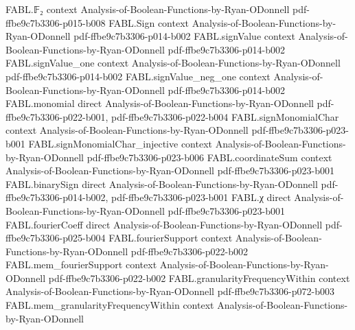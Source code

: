 \begin{theorem}
\label{FABL.expect_selectedWidth_le_clog_add_one}
\leanok
{}
\proofstep
  {FABL.𝔽₂}
  {context}
  {Analysis-of-Boolean-Functions-by-Ryan-ODonnell}
  {pdf-ffbe9c7b3306-p015-b008}
\proofstep
  {FABL.Sign}
  {context}
  {Analysis-of-Boolean-Functions-by-Ryan-ODonnell}
  {pdf-ffbe9c7b3306-p014-b002}
\proofstep
  {FABL.signValue}
  {context}
  {Analysis-of-Boolean-Functions-by-Ryan-ODonnell}
  {pdf-ffbe9c7b3306-p014-b002}
\proofstep
  {FABL.signValue_one}
  {context}
  {Analysis-of-Boolean-Functions-by-Ryan-ODonnell}
  {pdf-ffbe9c7b3306-p014-b002}
\proofstep
  {FABL.signValue_neg_one}
  {context}
  {Analysis-of-Boolean-Functions-by-Ryan-ODonnell}
  {pdf-ffbe9c7b3306-p014-b002}
\proofstep
  {FABL.monomial}
  {direct}
  {Analysis-of-Boolean-Functions-by-Ryan-ODonnell}
  {pdf-ffbe9c7b3306-p022-b001,
    pdf-ffbe9c7b3306-p022-b004}
\proofstep
  {FABL.signMonomialChar}
  {context}
  {Analysis-of-Boolean-Functions-by-Ryan-ODonnell}
  {pdf-ffbe9c7b3306-p023-b001}
\proofstep
  {FABL.signMonomialChar_injective}
  {context}
  {Analysis-of-Boolean-Functions-by-Ryan-ODonnell}
  {pdf-ffbe9c7b3306-p023-b006}
\proofstep
  {FABL.coordinateSum}
  {context}
  {Analysis-of-Boolean-Functions-by-Ryan-ODonnell}
  {pdf-ffbe9c7b3306-p023-b001}
\proofstep
  {FABL.binarySign}
  {direct}
  {Analysis-of-Boolean-Functions-by-Ryan-ODonnell}
  {pdf-ffbe9c7b3306-p014-b002,
    pdf-ffbe9c7b3306-p023-b001}
\proofstep
  {FABL.χ}
  {direct}
  {Analysis-of-Boolean-Functions-by-Ryan-ODonnell}
  {pdf-ffbe9c7b3306-p023-b001}
\proofstep
  {FABL.fourierCoeff}
  {direct}
  {Analysis-of-Boolean-Functions-by-Ryan-ODonnell}
  {pdf-ffbe9c7b3306-p025-b004}
\proofstep
  {FABL.fourierSupport}
  {context}
  {Analysis-of-Boolean-Functions-by-Ryan-ODonnell}
  {pdf-ffbe9c7b3306-p022-b002}
\proofstep
  {FABL.mem_fourierSupport}
  {context}
  {Analysis-of-Boolean-Functions-by-Ryan-ODonnell}
  {pdf-ffbe9c7b3306-p022-b002}
\proofstep
  {FABL.granularityFrequencyWithin}
  {context}
  {Analysis-of-Boolean-Functions-by-Ryan-ODonnell}
  {pdf-ffbe9c7b3306-p072-b003}
\proofstep
  {FABL.mem_granularityFrequencyWithin}
  {context}
  {Analysis-of-Boolean-Functions-by-Ryan-ODonnell}

\end{theorem}
